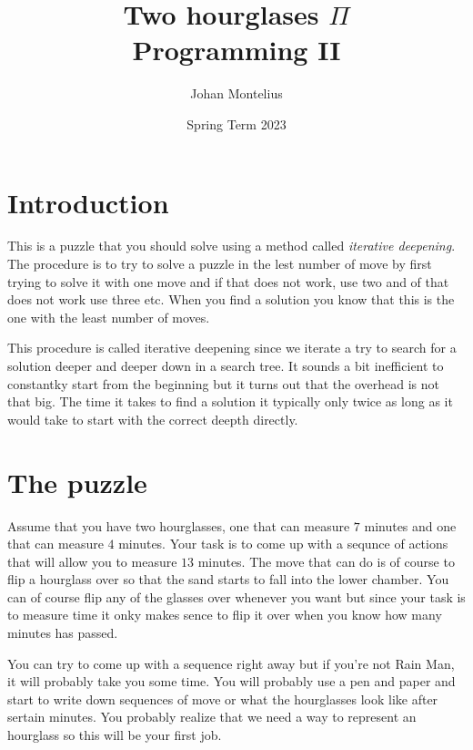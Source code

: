 \documentclass[a4paper,11pt]{article}
\begin{document}
\title{
    \textbf{Two hourglases $\Pi$}\\
    \large{Programming II}
}
\author{Johan Montelius}
\date{Spring Term 2023}
\maketitle
{}


\section*{Introduction}

This is a puzzle that you should solve using a method called {\em
  iterative deepening}. The procedure is to try to solve a puzzle in
the lest number of move by first trying to solve it with one move and
if that does not work, use two and of that does not work use three
etc. When you find a solution you know that this is the one with the
least number of moves.

This procedure is called iterative deepening since we iterate a try to
search for a solution deeper and deeper down in a search tree. It
sounds a bit inefficient to constantky start from the beginning but it
turns out that the overhead is not that big. The time it takes to find
a solution it typically only twice as long as it would take to start
with the correct deepth directly.

\section*{The puzzle}

Assume that you have two hourglasses, one that can measure $7$ minutes
and one that can measure $4$ minutes. Your task is to come up with a
sequnce of actions that will allow you to measure $13$ minutes. The
move that can do is of course to flip a hourglass over so that the
sand starts to fall into the lower chamber. You can of course flip any
of the glasses over whenever you want but since your task is to
measure time it onky makes sence to flip it over when you know how
many minutes has passed.

You can try to come up with a sequence right away but if you're not
Rain Man, it will probably take you some time. You will probably use a
pen and paper and start to write down sequences of move or what the
hourglasses look like after sertain minutes. You probably realize that
we need a way to represent an hourglass so this will be your first job.
\end{document}
